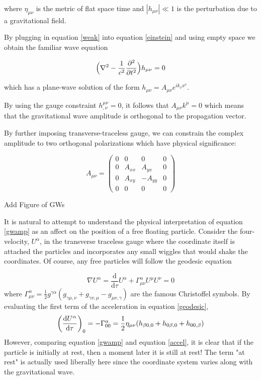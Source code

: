 \documentclass[oneside]{book}
\begin{document}
	where $\eta_{\mu \nu}$ is the metric of flat space time and $|h_{\mu \nu}| \ll 1$ is the perturbation due to a gravitational field.
	
	By plugging in equation \ref{weak} into equation \ref{einstein} and using empty space we obtain the familiar wave equation
	
	\begin{equation} \label{wave}
	\Big(\nabla^2 - \frac{1}{c^2} \pdv[2]{t} \Big) h_{\mu \nu}  = 0
	\end{equation}

	which has a plane-wave solution of the form $h_{\mu \nu} = A_{\mu \nu} e^{ik_{\nu} x^{\nu}}$. 
	
	By using the gauge constraint $h^{\mu \nu}_{,\nu} = 0$, it follows that $A_{\mu \nu} k^{\mu} = 0$ which means that the gravitational wave amplitude is orthogonal to the propagation vector.
	
	By further imposing transverse-traceless gauge, we can constrain the complex amplitude to two orthogonal polarizations which have physical significance:
	
	\begin{equation} \label{gwamp}
	A_{\mu \nu} = 
	\begin{pmatrix}
			0 &    0   &  0      & 0 
		 \\ 0 & A_{xx} &  A_{yx} & 0
		 \\ 0 & A_{xy} & -A_{yy} & 0
		 \\ 0 &    0   &  0      & 0
	\end{pmatrix}
	\end{equation}

	Add Figure of GWs

	It is natural to attempt to understand the physical interpretation of equation \ref{gwamp} as an affect on the position of a free floating particle. Consider the four-velocity, $U^{\alpha}$, in the transverse traceless gauge where the coordinate itself is attached the particles and incorporates any small wiggles that would shake the coordinates.  Of course, any free particles will follow the geodesic equation
	
	\begin{equation}\label{geodesic}
	\nabla U^{\alpha} = \frac{\text{d}}{\text{d} \tau} U^{\alpha} + \Gamma^{\alpha}_{\mu \nu} U^{\mu} U^{\nu} = 0
	\end{equation}	
	where $\Gamma^{\alpha}_{\mu \nu} = \frac{1}{2} g^{\gamma \alpha}(g_{\gamma \mu, \nu} + g_{\gamma \nu,\mu} - g_{\mu \nu, \gamma} )$ are the famous Christoffel symbols.
	By evaluating the first term of the acceleration in equation \ref{geodesic},
	\begin{equation}\label{accel}
	\bigg(\frac{\text{d}U^{\alpha}}{\text{d}\tau}\bigg)_0 = -\Gamma^{\alpha}_{00} 
	\\ = \frac{1}{2} \eta_{\mu \nu} (h_{\beta 0, 0} + h_{0 \beta, 0} + h_{0 0, \beta} )
	\end{equation}
	However, comparing equation \ref{gwamp} and equation \ref{accel}, it is clear that if the particle is initially at rest, then a moment later it is still at rest! The term "at rest" is actually used liberally here since the coordinate system varies along with the gravitational wave. 
	
\end{document}
